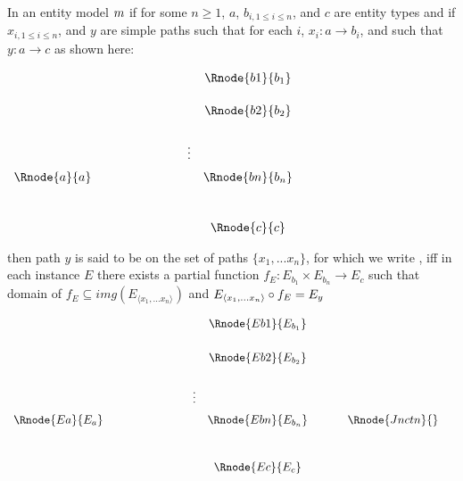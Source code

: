 \begin{definition} %
In an entity model ${m}$  
if for some $n \geq 1$, $a$, $b_{i, 1 \leq i \leq n}$,  and $c$ are entity types and 
if  $x_{i, 1 \leq i \leq n}$, and $y$ are simple paths such
that for each $i$, $x_i : a \rightarrow b_i$, and such that $y: a \rightarrow c$ 
as shown here:
\setlength{\arraycolsep}{.2cm}
\begin{center}
$
\begin{array}{cp{2cm}cc}
             & &         & \Rnode{b1}{b_1} \\ [0.5cm]
						 & &         & \Rnode{b2}{b_2} \\ [0.6cm]
						 & & \vdots  &                 \\ [0.2cm]
\Rnode{a}{a} & &         & \Rnode{bn}{b_n} \\ [1.0cm]
             & &         & \Rnode{c}{c}   \\
\end{array}
$
\end{center}



\noindent 
then path $y$ is said to be  on the set of paths $\{x_1,...x_n\}$, 
for which  we write  ,
iff
 in each instance $E$ there exists a  partial 
function $f_E: E_{b_1} \times E_{b_n} \rightarrow E_c$ 
\noindent such that 
domain of $f_E \subseteq img(E_{\langle x_1,... x_n \rangle})$ 
and  
$E_{\langle x_1,...x_n\rangle} \circ f_E = E_y$ 
\begin{center}
$
\begin{array}{cp{2cm}ccp{0.5cm}cc}
						    & &         & \Rnode{Eb1}{E_{b_1}}& &                            &        \\ [0.6cm]
						    & &         & \Rnode{Eb2}{E_{b_2}}& &                            &        \\ [0.6cm]
						    & &\vdots  &                      & &                            &        \\ [0.2cm]												
\Rnode{Ea}{E_a} & &         & \Rnode{Ebn}{E_{b_n}}& & \Rnode{Jnctn}{}&  \\ [1.0cm]
						    & &         & \Rnode{Ec}{{E_c}}   & &                            &        \\
\end{array}
$
\end{center}
\end{definition}

